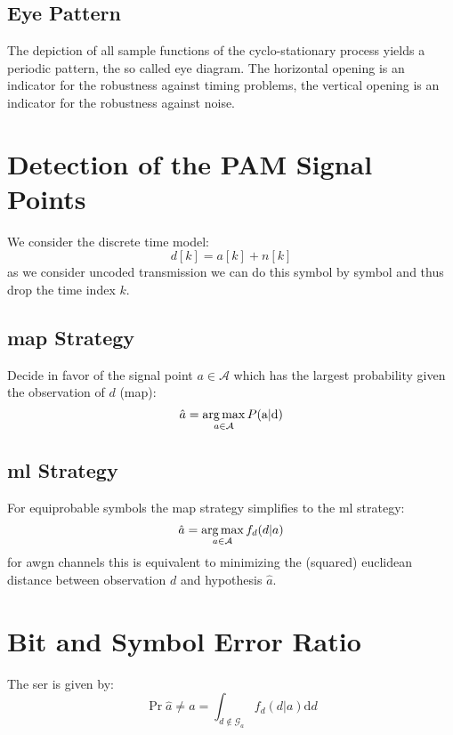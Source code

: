\subsection{Eye Pattern}
The depiction of all sample functions of the cyclo-stationary process yields a periodic
pattern, the so called eye diagram. The horizontal opening is an indicator for the
robustness against timing problems, the vertical opening is an indicator for the robustness
against noise.

\section{Detection of the PAM Signal Points}
We consider the discrete time model:
\begin{equation}
    d[k] = a[k] + n[k]
\end{equation}
as we consider uncoded transmission we can do this symbol by symbol and thus drop the 
time index $k$.

\subsection{\acl{map} Strategy}
Decide in favor of the signal point $a \in \mathcal{A}$ which has the largest probability
given the observation of $d$ (\ac{map}):
\begin{equation}
    \hat{a} = \operatorname*{arg\,max}_{a\in \mathcal{A}} P(\text{a}|\text{d})
\end{equation}

\subsection{\acl{ml} Strategy}
For equiprobable symbols the \ac{map} strategy simplifies to the \ac{ml} strategy:
\begin{equation}
    \hat{a} = \operatorname*{arg\,max}_{a \in \mathcal{A}} f_d(d|a)
\end{equation}
for \ac{awgn} channels this is equivalent to minimizing the (squared) euclidean distance
between observation $d$ and hypothesis $\hat{a}$.

\section{Bit and Symbol Error Ratio}
The \ac{ser} is given by:
\begin{equation}
    \Pr{\hat{a} \neq a} = \int_{d \notin \mathcal{G}_a} f_d(d|a) \text{d}d
\end{equation}

